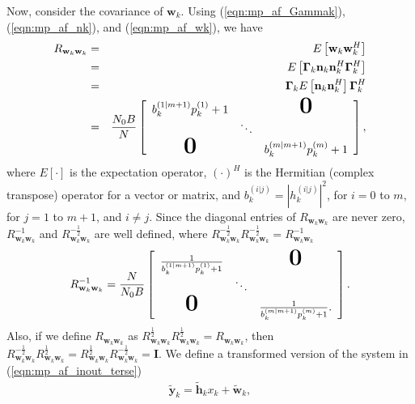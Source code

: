 Now, consider the covariance of $\mathbf{w}_k$.  Using (\ref{eqn:mp_af_Gammak}), (\ref{eqn:mp_af_nk}), and (\ref{eqn:mp_af_wk}), we have
\begin{eqnarray}
R_{\mathbf{w}_k\mathbf{w}_k} & = & E \left[ \mathbf{w}_k \mathbf{w}_k^H \right] \\
& = & E \left[ \mathbf{\Gamma}_k \mathbf{n}_k \mathbf{n}_k^H \mathbf{\Gamma}_k^H \right] \\
& = & \mathbf{\Gamma}_k E \left[ \mathbf{n}_k \mathbf{n}_k^H  \right] \mathbf{\Gamma}_k^H \\
& = &  \frac{N_0B}{N} \left[
\begin{array}{ccc}
b_k^{(1|m+1)} p_k^{(1)}  + 1 & & \textbf{\mbox{\huge{0}}} \\
 & \ddots & \\
\textbf{\mbox{\huge{0}}}  & &  b_k^{(m|m+1)} p_k^{(m)} + 1
\end{array} \right],
\label{eqn:mp_af_Rwkwk}
\end{eqnarray}
where $E\left[ \cdot \right]$ is the expectation operator, $\left( \cdot \right)^H$ is the Hermitian (complex transpose) operator for a vector or matrix, and $b_k^{(i|j)} = \left| h_k^{(i|j)} \right|^2$, for $i=0$ to $m$, for $j=1$ to $m+1$, and $i \neq j$.  Since the diagonal entries of $R_{\mathbf{w}_k\mathbf{w}_k}$ are never zero, $R_{\mathbf{w}_k\mathbf{w}_k}^{-1}$ and $R_{\mathbf{w}_k\mathbf{w}_k}^{-\frac{1}{2}}$ are well defined, where $R_{\mathbf{w}_k\mathbf{w}_k}^{-\frac{1}{2}}R_{\mathbf{w}_k\mathbf{w}_k}^{-\frac{1}{2}} = R_{\mathbf{w}_k\mathbf{w}_k}^{-1}$
\begin{eqnarray}
R_{\mathbf{w}_k\mathbf{w}_k}^{-1} = \frac{N}{N_0B} \left[
\begin{array}{ccc}
\frac{1}{ b_k^{(1|m+1)} p_k^{(1)}+ 1} & & \textbf{\mbox{\huge{0}}} \\
 & \ddots & \\
\textbf{\mbox{\huge{0}}}  & & \frac{1}{ b_k^{(m|m+1)}p_k^{(m)} + 1}
.\label{eqn:mp_af_Rwkwk_inv}
\end{array} \right]. 
\end{eqnarray}
Also, if we define $R_{\mathbf{w}_k\mathbf{w}_k}$ as $R_{\mathbf{w}_k\mathbf{w}_k}^{\frac{1}{2}} R_{\mathbf{w}_k\mathbf{w}_k}^{\frac{1}{2}} =R_{\mathbf{w}_k\mathbf{w}_k}$, then $R_{\mathbf{w}_k\mathbf{w}_k}^{-\frac{1}{2}}R_{\mathbf{w}_k\mathbf{w}_k}^{\frac{1}{2}} = R_{\mathbf{w}_k\mathbf{w}_k}^{\frac{1}{2}}R_{\mathbf{w}_k\mathbf{w}_k}^{-\frac{1}{2}} = \mathbf{I}$.
We define a transformed version of the system in (\ref{eqn:mp_af_inout_terse})
\begin{eqnarray}
\tilde{\mathbf{y}}_k = \tilde{\mathbf{h}}_k x_k + \tilde{\mathbf{w}}_k,
\end{eqnarray}
